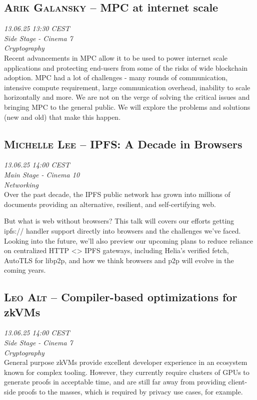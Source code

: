 \clearpage
\subsection {\textsc{Arik Galansky}  -- MPC at internet scale} \noindent \textit {13.06.25 13:30 CEST\\ Side Stage - Cinema 7\\ Cryptography}\\[1em] Recent advancements in MPC allow it to be used to power internet scale applications and protecting end-users from some of the risks of wide blockchain adoption. MPC had a lot of challenges - many rounds of communication, intensive compute requirement, large communication overhead, inability to scale horizontally and more. We are not on the verge of solving the critical issues and bringing MPC to the general public. We will explore the problems and solutions (new and old) that make this happen.

\clearpage
\subsection {\textsc{Michelle Lee}  -- IPFS: A Decade in Browsers} \noindent \textit {13.06.25 14:00 CEST\\ Main Stage - Cinema 10\\ Networking}\\[1em] Over the past decade, the IPFS public network has grown into millions of documents providing an alternative, resilient, and self-certifying web.

But what is web without browsers? This talk will covers our efforts getting ipfs:// handler support directly into browsers and the challenges we've faced. Looking into the future, we'll also preview our upcoming plans to reduce reliance on centralized HTTP \textless{}\textgreater{} IPFS gateways, including Helia's verified fetch, AutoTLS for libp2p, and how we think browsers and p2p will evolve in the coming years.

\clearpage
\subsection {\textsc{Leo Alt}  -- Compiler-based optimizations for zkVMs} \noindent \textit {13.06.25 14:00 CEST\\ Side Stage - Cinema 7\\ Cryptography}\\[1em] General purpose zkVMs provide excellent developer experience in an ecosystem
known for complex tooling. However, they currently require clusters of GPUs to
generate proofs in acceptable time, and are still far away from providing client-side
proofs to the masses, which is required by privacy use cases, for example.

